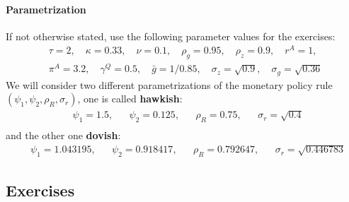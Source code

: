 \documentclass{article}
\begin{document}
\paragraph{Parametrization}
If not otherwise stated, use the following parameter values for the exercises:
\begin{align*}
	&\tau=2,\quad
	\kappa=0.33,\quad
	\nu=0.1,\quad
	\rho_g=0.95,\quad
	\rho_z=0.9,\quad	
	r^{A}=1,\quad
	\\
	&\pi^{A}=3.2,\quad
	\gamma^{Q}=0.5,\quad
	\bar{g}=1/0.85,\quad
	\sigma_z = \sqrt{0.9},\quad
	\sigma_g=\sqrt{0.36}
  \end{align*}
We will consider two different parametrizations of the monetary policy rule $(\psi_1,\psi_2,\rho_R,\sigma_r)$, one is called \textbf{hawkish}:
\begin{align*}
	&\psi_1=1.5,&& \psi_2=0.125,&& \rho_R = 0.75,&& \sigma_r = \sqrt{0.4}	\\
\end{align*}
and the other one \textbf{dovish}:
\begin{align*}
	&\psi_1=1.043195,&& \psi_2=0.918417,&& \rho_R = 0.792647,&& \sigma_r = \sqrt{0.446783}	
\end{align*}
\newpage
\subsection*{Exercises}
\end{document}

